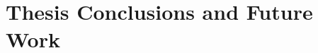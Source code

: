 \documentclass{umthesis}          %
\begin{document}
%



%

\chapter{Thesis Conclusions and Future Work}
\label{ch:conclusion}





\appendix





%


\backmatter  %




\end{document}
